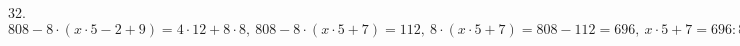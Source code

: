 32. $808-8\cdot(x\cdot5-2+9)=4\cdot12+8\cdot8,\ 808-8\cdot(x\cdot5+7)=112,\ 8\cdot(x\cdot5+7)=808-112=696,\ x\cdot5+7=696:8=87,\ x\cdot5=87-7=80,\ x=80:5=16.$\\

